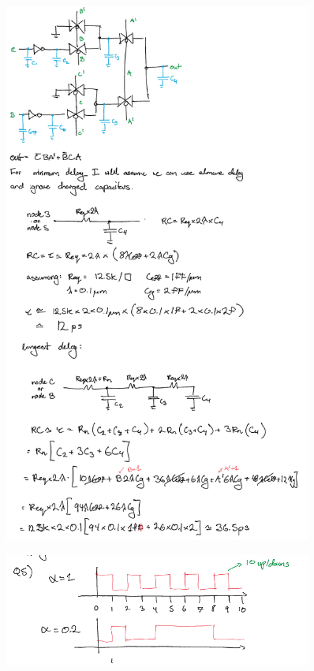 \documentclass[11pt]{article}
\begin{document}
\begin{figure}[H]
    \centering
\includegraphics[width=0.9\textwidth]{3b.png}
\end{figure}
\begin{figure}[H]
    \centering
\includegraphics[width=0.9\textwidth]{5.png}
\end{figure}
\end{document}
